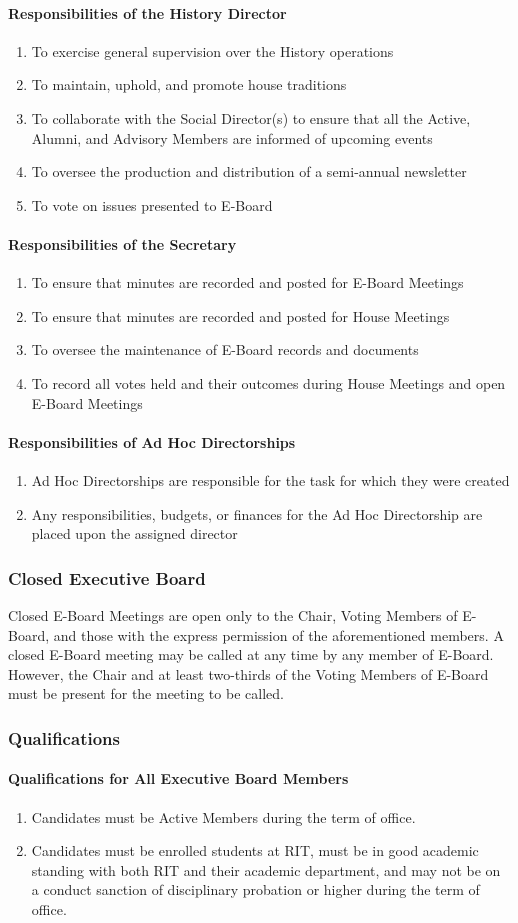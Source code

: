 \documentclass{article}
\newcommand{\asubsection}[1]{\subsubsection{#1} \label{#1}}
\newcommand{\asubsubsection}[1]{\paragraph{#1} \label{#1}}
\begin{document}
\asubsubsection{Responsibilities of the History Director}
\begin{enumerate}
	\item To exercise general supervision over the History operations
	\item To maintain, uphold, and promote house traditions
	\item To collaborate with the Social Director(s) to ensure that all the Active, Alumni, and Advisory Members are informed of upcoming events
	\item To oversee the production and distribution of a semi-annual newsletter
	\item To vote on issues presented to E-Board
\end{enumerate}

\asubsubsection{Responsibilities of the Secretary}
\begin{enumerate}
	\item To ensure that minutes are recorded and posted for E-Board Meetings
	\item To ensure that minutes are recorded and posted for House Meetings
	\item To oversee the maintenance of E-Board records and documents
	\item To record all votes held and their outcomes during House Meetings and open E-Board Meetings
\end{enumerate}

\asubsubsection{Responsibilities of Ad Hoc Directorships}
\begin{enumerate}
	\item Ad Hoc Directorships are responsible for the task for which they were created
	\item Any responsibilities, budgets, or finances for the Ad Hoc Directorship are placed upon the assigned director
\end{enumerate}

\asubsection{Closed Executive Board}
Closed E-Board Meetings are open only to the Chair, Voting Members of E-Board, and those with the express permission of the aforementioned members.
A closed E-Board meeting may be called at any time by any member of E-Board.
However, the Chair and at least two-thirds of the Voting Members of E-Board must be present for the meeting to be called.

\asubsection{Qualifications}

\asubsubsection{Qualifications for All Executive Board Members}
\begin{enumerate}
	\item Candidates must be Active Members during the term of office.
	\item Candidates must be enrolled students at RIT, must be in good academic standing with both RIT and their academic department, and may not be on a conduct sanction of disciplinary probation or higher during the term of office.
\end{enumerate}
\end{document}
